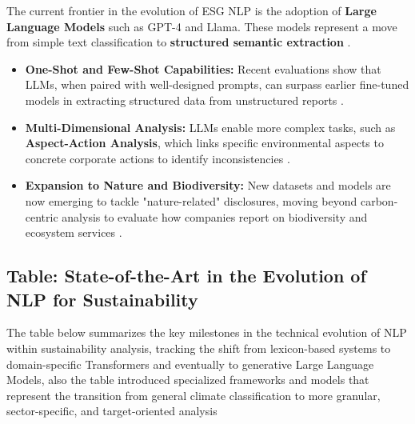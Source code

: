 \documentclass[english, online, cse, master]{dithesis}
\begin{document}
The current frontier in the evolution of ESG NLP is the adoption of \textbf{Large Language Models} such as GPT-4 and Llama. These models represent a move from simple text classification to \textbf{structured semantic extraction}  \parencite{seyed_alireza_mousavian_anaraki_b56a1c0f}.
\begin{itemize}
\item 

\textbf{One-Shot and Few-Shot Capabilities:} Recent evaluations show that LLMs, when paired with well-designed prompts, can surpass earlier fine-tuned models in extracting structured data from unstructured reports  \parencite{frederik_maibaum_b8629037}.\item 

\textbf{Multi-Dimensional Analysis:} LLMs enable more complex tasks, such as \textbf{Aspect-Action Analysis}, which links specific environmental aspects to concrete corporate actions to identify inconsistencies  \parencite{keane_ong_369a0b63}.\item 

\textbf{Expansion to Nature and Biodiversity:} New datasets and models are now emerging to tackle "nature-related" disclosures, moving beyond carbon-centric analysis to evaluate how companies report on biodiversity and ecosystem services  \parencite{tobias_schimanski_3549ff9f}.
\end{itemize}
\subsection{Table: State-of-the-Art in the Evolution of NLP for Sustainability}

The table below summarizes the key milestones in the technical evolution of NLP within sustainability analysis, tracking the shift from lexicon-based systems to domain-specific Transformers and eventually to generative Large Language Models, also the table introduced specialized frameworks and models that represent the transition from general climate classification to more granular, sector-specific, and target-oriented analysis
\end{document}
